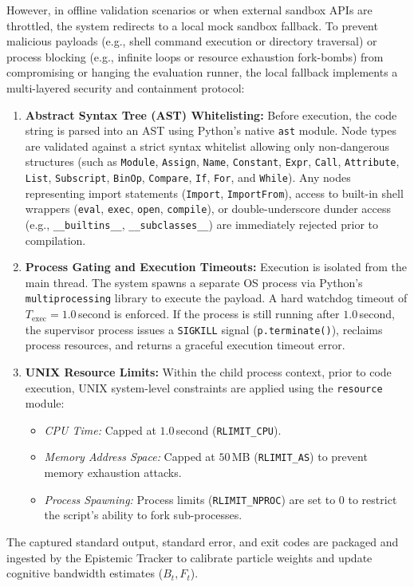 \documentclass[11pt,a4paper]{report}
\begin{document}
However, in offline validation scenarios or when external sandbox APIs are throttled, the system redirects to a local mock sandbox fallback. To prevent malicious payloads (e.g., shell command execution or directory traversal) or process blocking (e.g., infinite loops or resource exhaustion fork-bombs) from compromising or hanging the evaluation runner, the local fallback implements a multi-layered security and containment protocol:
\begin{enumerate}
    \item \textbf{Abstract Syntax Tree (AST) Whitelisting:} Before execution, the code string is parsed into an AST using Python's native \texttt{ast} module. Node types are validated against a strict syntax whitelist allowing only non-dangerous structures (such as \texttt{Module}, \texttt{Assign}, \texttt{Name}, \texttt{Constant}, \texttt{Expr}, \texttt{Call}, \texttt{Attribute}, \texttt{List}, \texttt{Subscript}, \texttt{BinOp}, \texttt{Compare}, \texttt{If}, \texttt{For}, and \texttt{While}). Any nodes representing import statements (\texttt{Import}, \texttt{ImportFrom}), access to built-in shell wrappers (\texttt{eval}, \texttt{exec}, \texttt{open}, \texttt{compile}), or double-underscore dunder access (e.g., \texttt{\_\_builtins\_\_}, \texttt{\_\_subclasses\_\_}) are immediately rejected prior to compilation.
    \item \textbf{Process Gating and Execution Timeouts:} Execution is isolated from the main thread. The system spawns a separate OS process via Python's \texttt{multiprocessing} library to execute the payload. A hard watchdog timeout of $T_{\text{exec}} = 1.0$\,second is enforced. If the process is still running after $1.0$\,second, the supervisor process issues a \texttt{SIGKILL} signal (\texttt{p.terminate()}), reclaims process resources, and returns a graceful execution timeout error.
    \item \textbf{UNIX Resource Limits:} Within the child process context, prior to code execution, UNIX system-level constraints are applied using the \texttt{resource} module:
    \begin{itemize}
        \item \textit{CPU Time:} Capped at $1.0$\,second (\texttt{RLIMIT\_CPU}).
        \item \textit{Memory Address Space:} Capped at $50$\,MB (\texttt{RLIMIT\_AS}) to prevent memory exhaustion attacks.
        \item \textit{Process Spawning:} Process limits (\texttt{RLIMIT\_NPROC}) are set to $0$ to restrict the script's ability to fork sub-processes.
    \end{itemize}
\end{enumerate}
The captured standard output, standard error, and exit codes are packaged and ingested by the Epistemic Tracker to calibrate particle weights and update cognitive bandwidth estimates ($B_t, F_t$).
\end{document}
